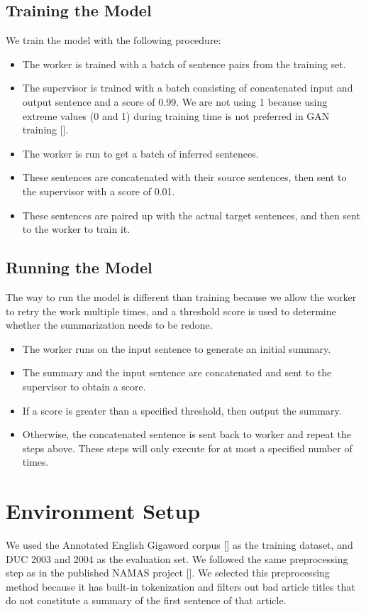 \documentclass[letterpaper]{article} %
\begin{document}
\subsection{Training the Model}
We train the model with the following procedure:
\begin{itemize}
	\item The worker is trained with a batch of sentence pairs from the training set.
	\item The supervisor is trained with a batch consisting of concatenated input and output sentence and a score of 0.99. We are not using 1 because using extreme values (0 and 1) during training time is not preferred in GAN training [].
	\item The worker is run to get a batch of inferred sentences.
	\item These sentences are concatenated with their source sentences, then sent to the supervisor with a score of 0.01.
	\item These sentences are paired up with the actual target sentences, and then sent to the worker to train it.
\end{itemize}

\subsection{Running the Model}
The way to run the model is different than training because we allow the worker to retry the work multiple times, and a threshold score is used to determine whether the summarization needs to be redone.
\begin{itemize}
	\item The worker runs on the input sentence to generate an initial summary.
	\item The summary and the input sentence are concatenated and sent to the supervisor to obtain a score.
	\item If a score is greater than a specified threshold, then output the summary.
	\item Otherwise, the concatenated sentence is sent back to worker and repeat the steps above. These steps will only execute for at most a specified number of times.
\end{itemize}

\section{Environment Setup}
We used the Annotated English Gigaword corpus [] as the training dataset, and DUC 2003 and 2004 as the evaluation set. We followed the same preprocessing step as in the published NAMAS project []. We selected this preprocessing method because it has built-in tokenization and filters out bad article titles that do not constitute a summary of the first sentence of that article.
\end{document}

